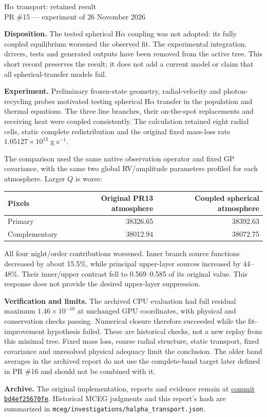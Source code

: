 \documentclass[10pt,a4paper]{article}
\begin{document}
\begin{center}
{\Large H$\alpha$ transport: retained result}\\
PR \#15 --- experiment of 26 November 2026
\end{center}

\textbf{Disposition.}
The tested spherical H$\alpha$ coupling was not adopted: its fully coupled
equilibrium worsened the observed fit. The experimental integration, drivers,
tests and generated outputs have been removed from the active tree. This
short record preserves the result; it does not add a current model or claim
that all spherical-transfer models fail.

\textbf{Experiment.}
Preliminary frozen-state geometry, radial-velocity and photon-recycling
probes motivated testing spherical H$\alpha$ transfer in the population and
thermal equations. The three line branches, their on-the-spot replacements
and receiving heat were coupled consistently. The calculation retained eight
radial cells, static complete redistribution and the original fixed mass-loss
rate $1.05127\times10^{13}$ g s$^{-1}$.

The comparison used the same native observation operator and fixed GP
covariance, with the same two global RV/amplitude parameters profiled for
each atmosphere. Larger $Q$ is worse:
\begin{center}
\begin{tabular}{lrr}
\toprule
Pixels & Original PR13 atmosphere & Coupled spherical atmosphere \\
\midrule
Primary & 38326.65 & 38392.63 \\
Complementary & 38012.94 & 38072.75 \\
\bottomrule
\end{tabular}
\end{center}
All four night/order contributions worsened. Inner branch source functions
decreased by about 15.5\%, while principal upper-layer sources increased by
44--48\%. Their inner/upper contrast fell to 0.569--0.585 of its original
value. This response does not provide the desired upper-layer suppression.

\textbf{Verification and limits.}
The archived CPU evaluation had full residual maximum $1.46\times10^{-10}$
at unchanged GPU coordinates, with physical and conservation checks passing.
Numerical closure therefore succeeded while the fit-improvement hypothesis
failed. These are historical checks, not a new replay from this minimal tree.
Fixed mass loss, coarse radial structure, static transport, fixed covariance
and unresolved physical adequacy limit the conclusion. The older band
averages in the archived report do not use the complete-band target later
defined in PR \#16 and should not be combined with it.

\textbf{Archive.}
The original implementation, reports and evidence remain at
\href{https://github.com/HajimeKawahara/exojax-escape/tree/bd4ef25670fea8fe97f5a7c5088f7cccc91f7e5c}{commit \texttt{bd4ef25670fe}}.
Historical MCEG judgments and this report's hash are summarized in
\texttt{mceg/investigations/halpha\_transport.json}.
\end{document}
